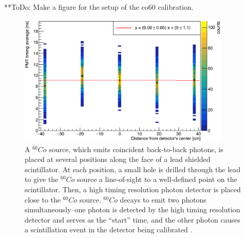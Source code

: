 **ToDo: Make a figure for the setup of the co60 calibration. 

\begin{figure}
    \centering
    \includegraphics[width = 0.9\textwidth]{Content/Methods/CO60Validation.png}
    \caption{A $^{60}Co$ source, which emits coincident back-to-back photons, is placed at several positions along the face of a lead shielded scintillator.
    At each position, a small hole is drilled through the lead to give the $^{60}Co$ source a line-of-sight to a well-defined point on the scintillator.
    Then, a high timing resolution photon detector is placed close to the $^{60}Co$ source.
    $^{60}Co$ decays to emit two photons simultaneously--one photon is detected by the high timing resolution detector and serves as the ``start'' time, and the other photon causes a scintillation event in the detector being calibrated .}
    \label{fig:Co60Validation}
\end{figure}

